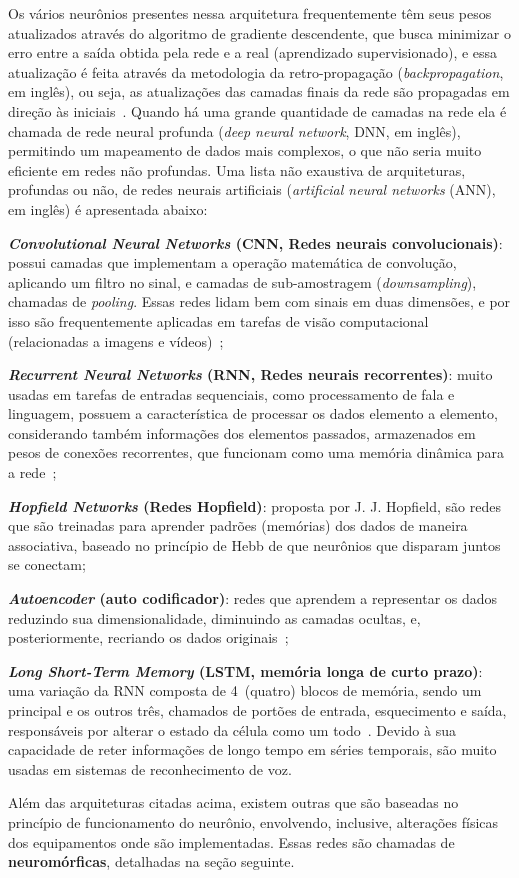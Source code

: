 Os vários neurônios presentes nessa arquitetura frequentemente têm seus pesos atualizados através do algoritmo de gradiente descendente, que busca minimizar o erro entre a saída obtida pela rede e a real (aprendizado supervisionado), e essa atualização é feita através da metodologia da retro-propagação (\textit{backpropagation}, em inglês), ou seja, as atualizações das camadas finais da rede são propagadas em direção às iniciais~\cite{werbos_beyond_1974}. Quando há uma grande quantidade de camadas na rede ela é chamada de rede neural profunda (\textit{deep neural network}, DNN, em inglês), permitindo um mapeamento de dados mais complexos, o que não seria muito eficiente em redes não profundas. Uma lista não exaustiva de arquiteturas, profundas ou não, de redes neurais artificiais (\textit{artificial neural networks} (ANN), em inglês) é apresentada abaixo:
\begin{alineas}
	\item \textbf{\textit{Convolutional Neural Networks} (CNN, Redes neurais convolucionais)}: possui camadas que implementam a operação matemática de convolução, aplicando um filtro no sinal, e camadas de sub-amostragem (\textit{downsampling}), chamadas de \textit{pooling}. Essas redes lidam bem com sinais em duas dimensões, e por isso são frequentemente aplicadas em tarefas de visão computacional (relacionadas a imagens e vídeos)~\cite{lecun_gradient-based_1998};
	\item \textbf{\textit{Recurrent Neural Networks} (RNN, Redes neurais recorrentes)}: muito usadas em tarefas de entradas sequenciais, como processamento de fala e linguagem, possuem a característica de processar os dados elemento a elemento, considerando também informações dos elementos passados, armazenados em pesos de conexões recorrentes, que funcionam como uma memória dinâmica para a rede~\cite{elman_finding_1990};
	\item \textbf{\textit{Hopfield Networks} (Redes Hopfield)}: proposta por J. J. Hopfield, são redes que são treinadas para aprender padrões (memórias) dos dados de maneira associativa, baseado no princípio de Hebb de que neurônios que disparam juntos se conectam;
	\item \textbf{\textit{Autoencoder} (auto codificador)}: redes que aprendem a representar os dados reduzindo sua dimensionalidade, diminuindo as camadas ocultas, e, posteriormente, recriando os dados originais~\cite{hinton_reducing_2006};
	\item \textbf{\textit{Long Short-Term Memory} (LSTM, memória longa de curto prazo)}: uma variação da RNN composta de 4~(quatro) blocos de memória, sendo um principal e os outros três, chamados de portões de entrada, esquecimento e saída, responsáveis por alterar o estado da célula como um todo~\cite{hochreiter_long_1997}. Devido à sua capacidade de reter informações de longo tempo em séries temporais, são muito usadas em sistemas de reconhecimento de voz.
\end{alineas}
Além das arquiteturas citadas acima, existem outras que são baseadas no princípio de funcionamento do neurônio, envolvendo, inclusive, alterações físicas dos equipamentos onde são implementadas. Essas redes são chamadas de \textbf{neuromórficas}, detalhadas na seção seguinte.

